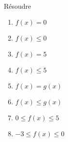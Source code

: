 \exercice~\\

\begin{minipage}{0.25\textwidth}
	
\end{minipage}
\hfill
\begin{minipage}{0.17\textwidth}
Résoudre
\begin{enumerate}
	\item $f(x) = 0$
	\item $f(x) \leqslant 0$\\
	\item $f(x) = 5$
	\item $f(x) \leqslant 5$\\
	\item $f(x) = g(x)$
	\item $f(x) \leqslant g(x)$\\
	\item $0 \leqslant f(x) \leqslant 5$
	\item $-3 \leqslant f(x) \leqslant 0$
\end{enumerate}
\end{minipage}